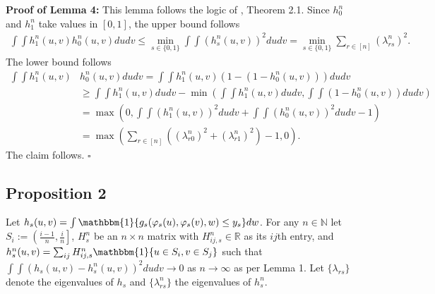 \documentclass[12pt]{article}
\theoremstyle{definition}
\begin{document}
\begin{flushleft}
\textbf{Proof of Lemma 4:} This lemma follows the logic of \cite{whitt1976bivariate}, Theorem 2.1. Since  $h_{0}^{n}$ and $h_{1}^{n}$ take values in $[0,1]$, the upper bound follows  
\begin{align*}
\int\int h^{n}_{1}(u,v)h^{n}_{0}(u,v)dudv 
\leq \min_{s \in \{0,1\}}\int\int (h^{n}_{s}(u,v))^{2}dudv 
= \min_{s \in \{0,1\}}\sum_{r \in [n]}(\lambda_{rs}^{n})^{2}.
\end{align*}
The lower bound follows
 \begin{align*}
 \int\int h^{n}_{1}(u,v)&h^{n}_{0}(u,v)dudv 
 = \int\int h^{n}_{1}(u,v)\left( 1 - \left(1 - h^{n}_{0}(u,v)\right)\right)dudv \\
 &\geq \int\int h^{n}_{1}(u,v)dudv - \min \left(\int\int h^{n}_{1}(u,v)dudv , \int\int\left(1 - h^{n}_{0}(u,v)\right)dudv\right)\\
  &= \max\left(0,\int\int (h^{n}_{1}(u,v))^{2}dudv + \int\int (h^{n}_{0}(u,v))^{2}dudv - 1\right) \\
 &= \max\left(\sum_{r \in [n]}\left((\lambda_{r0}^{n})^{2}+(\lambda_{r1}^{n})^{2}\right) - 1,0\right). 
 \end{align*}
 The claim follows. $\square$
\end{flushleft}


\subsection{Proposition 2}
Let $h_{s}(u,v) = \int\mathbbm{1}\{g_{s}(\varphi_s(u),\varphi_s(v),w) \leq y_{s}\}dw$. For any $n\in \mathbb{N}$ let $S_{i} := \left(\frac{i-1}{n},\frac{i}{n}\right]$, $H_{s}^{n}$ be an $n\times n$ matrix with $H_{ij,s}^{n} \in \mathbb{R}$ as its $ij$th entry, and $h_{s}^{n}(u,v) = \sum_{ij}H_{ij,s}^{n}\mathbbm{1}\{u \in S_{i}, v \in S_{j}\}$ such that $\int\int\left(h_{s}(u,v)-h_{s}^{n}(u,v)\right)^{2}dudv \to 0$ as $n\to\infty$ as per Lemma 1. Let $\{\lambda_{rs}\}$ denote the eigenvalues of  $h_{s}$ and $\{\lambda^{n}_{rs}\}$ the eigenvalues of  $h_{s}^{n}$. \newline
\end{document}
